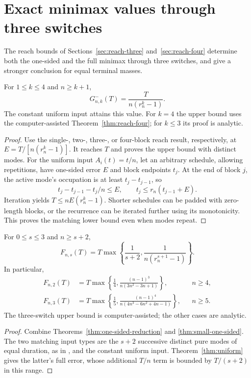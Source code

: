 \section{Exact minimax values through three switches}\label{sec:small-minimax}

The reach bounds of Sections~\ref{sec:reach-three} and~\ref{sec:reach-four}
determine both the one-sided and the full minimax through three switches, and
give a stronger conclusion for equal terminal masses.

\begin{theorem}\label{thm:small-one-sided}
For $1\le k\le4$ and $n\ge k+1$,
\begin{equation}\label{eq:small-one-sided}
 G^-_{n,k}(T)=\frac{T}{n(r_n^k-1)}.
\end{equation}
The constant uniform input attains this value. For $k=4$ the upper bound
uses the computer-assisted Theorem~\ref{thm:reach-four}; for $k\le3$ its
proof is analytic.
\end{theorem}
\begin{proof}
Use the single-, two-, three-, or four-block reach result, respectively,
at $E=T/[n(r_n^k-1)]$. It reaches $T$ and proves the upper bound with
distinct modes. For the uniform input $A_i(t)=t/n$, let an arbitrary
schedule, allowing repetitions, have one-sided error $E$ and block
endpoints $t_j$. At the end of block $j$, the active mode's occupation
is at least $t_j-t_{j-1}$, so
\[
 t_j-t_{j-1}-t_j/n\le E,
 \qquad t_j\le r_n(t_{j-1}+E).
\]
Iteration yields $T\le nE(r_n^k-1)$. Shorter schedules can be padded
with zero-length blocks, or the recurrence can be iterated further using
its monotonicity. This proves the matching lower bound even when modes
repeat.
\end{proof}

\begin{theorem}\label{thm:small-full}
For $0\le s\le3$ and $n\ge s+2$,
\begin{equation}\label{eq:small-full}
 F_{n,s}(T)=T\max\left\{\frac1{s+2},
                  \frac1{n(r_n^{s+1}-1)}\right\}.
\end{equation}
In particular,
\begin{align}
 F_{n,2}(T)&=T\max\left\{\frac14,
           \frac{(n-1)^3}{n(3n^2-3n+1)}\right\}, && n\ge4,
           \label{eq:two-switch-exact}\\
 F_{n,3}(T)&=T\max\left\{\frac15,
           \frac{(n-1)^4}{n(4n^3-6n^2+4n-1)}\right\}, && n\ge5.
           \label{eq:three-switch-exact}
\end{align}
The three-switch upper bound is computer-assisted; the other cases are
analytic.
\end{theorem}
\begin{proof}
Combine Theorems~\ref{thm:one-sided-reduction} and
\ref{thm:small-one-sided}. The two matching input types are the $s+2$
successive distinct pure modes of equal duration, as in
\cite[Proposition~4]{sager-zeile2021}, and the constant uniform input. Theorem~\ref{thm:uniform} gives the latter's full error, whose
additional $T/n$ term is bounded by $T/(s+2)$ in this range.
\end{proof}

